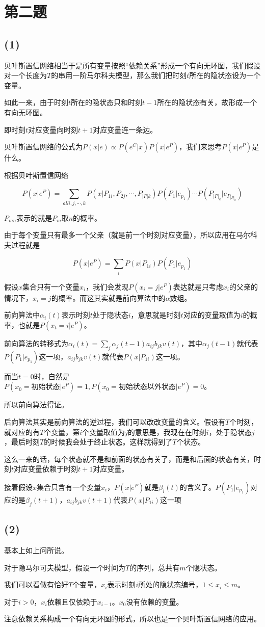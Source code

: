 \documentclass{ctexart}
\begin{document}
\section{第二题}
\subsection*{(1)}
贝叶斯置信网络相当于是所有变量按照“依赖关系”形成一个有向无环图，我们假设对一个长度为$T$的串用一阶马尔科夫模型，那么我们把时刻$t$所在的隐状态设为一个变量。

如此一来，由于时刻$t$所在的隐状态只和时刻$t-1$所在的隐状态有关，故形成一个有向无环图。

即时刻$t$对应变量向时刻$t+1$对应变量连一条边。

贝叶斯置信网络的公式为$P(x|e) \propto P(e^C|x)P(x|e^P)$，我们来思考$P(x|e^P)$是什么。

根据贝叶斯置信网络

\[
P(x|e^P)=\sum_{all i,j,\cdots,k} P(x|P_{1i},P_{2j},\cdots,P_{|P|k})P(P_1|e_{p_1})\cdots P(P_{|P|_k}|e_{P_{|P|_k}})
\]

$P_{mn}$表示的就是$P_m$取$n$的概率。

由于每个变量只有最多一个父亲（就是前一个时刻对应变量），所以应用在马尔科夫过程就是

\[
P(x|e^P)=\sum_{i} P(x|P_{1i})P(P_1|e_{p_1})
\]

假设$x$集合只有一个变量$x_i$，我们会发现$P(x_i=j|e^P)$表达就是只考虑$x_i$的父亲的情况下，$x_i=j$的概率。而这其实就是前向算法中的$\alpha$数组。

前向算法中$\alpha_i(t)$表示时刻$t$处于隐状态$i$，意思就是时刻$t$对应的变量取值为$i$的概率，也就是$P(x_t=i|e^P)$。

前向算法的转移式为$\alpha_i(t)=\sum_j \alpha_j(t-1)a_{ij}b_{jk}v(t)$，其中$\alpha_j(t-1)$就代表$P(P_1|e_{p_1})$这一项，$a_{ij}b_{jk}v(t)$就代表$P(x|P_{1i})$这一项。

而当$t=0$时，自然是$P(x_0=\textrm{初始状态}|e^P)=1,P(x_0=\textrm{初始状态以外状态}|e^P)=0$。

所以前向算法得证。

后向算法其实是前向算法的逆过程，我们可以改改变量的含义。假设有$T$个时刻，就对应的有$T$个变量，第$i$个变量取值为$j$的意思是，我现在在时刻$i$，处于隐状态$j$，最后时刻$T$的时候我会处于终止状态。这样就得到了$T$个状态。

这么一来的话，每个状态就不是和前面的状态有关了，而是和后面的状态有关，时刻$t$对应变量依赖于时刻$t+1$对应变量。

接着假设$x$集合只含有一个变量$x_i$，$P(x|e^P)$就是$\beta_i(t)$的含义了。$P(P_1|e_{p_1})$对应的是$\beta_j(t+1)$，$a_{ij}b_{jk}v(t+1)$代表$P(x|P_{1i})$这一项
\subsection*{(2)}
基本上如上问所说。

对于隐马尔可夫模型，假设一个时间为$T$的序列，总共有$m$个隐状态。

我们可以看做有恰好$T$个变量，$x_i$表示时刻$i$所处的隐状态编号，$1 \le x_i \le m$。

对于$i>0$，$x_i$依赖且仅依赖于$x_{i-1}$。$x_0$没有依赖的变量。

注意依赖关系构成一个有向无环图的形式，所以也是一个贝叶斯置信网络的应用。
\end{document}
